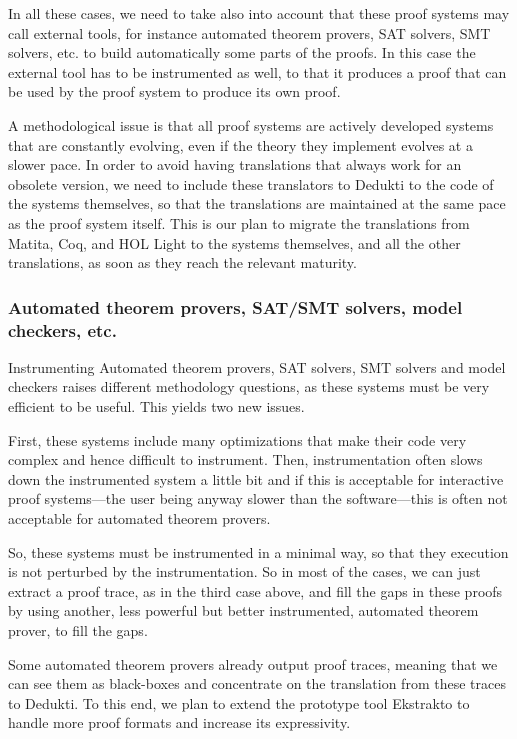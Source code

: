 In all these cases, we need to take also into account that these proof
systems may call external tools, for instance automated theorem
provers, SAT solvers, SMT solvers, etc. to build automatically some
parts of the proofs. In this case the external tool has to be
instrumented as well, to that it produces a proof that can be used by
the proof system to produce its own proof.

A methodological issue is that all proof systems are actively
developed systems that are constantly evolving, even if the theory
they implement evolves at a slower pace. In order to avoid having
translations that always work for an obsolete version, we need to
include these translators to Dedukti to the code of the systems
themselves, so that the translations are maintained at the same pace
as the proof system itself. This is our plan to migrate the
translations from Matita, Coq, and HOL Light to the systems
themselves, and all the other translations, as soon as they reach the
relevant maturity.

\subsubsection*{Automated theorem provers, SAT/SMT solvers, model checkers,
  etc.}

Instrumenting Automated theorem provers, SAT solvers, SMT solvers and
model checkers raises different methodology questions, as these systems
must be very efficient to be useful. This yields two new issues.

First, these systems include many optimizations that make their code
very complex and hence difficult to instrument. Then, instrumentation
often slows down the instrumented system a little bit and if this is
acceptable for interactive proof systems---the user being anyway
slower than the software---this is often not acceptable for automated
theorem provers.

So, these systems must be instrumented in a minimal way, so that they
execution is not perturbed by the instrumentation. So in most of the
cases, we can just extract a proof trace, as in the third case above,
and fill the gaps in these proofs by using another, less powerful but better
instrumented, automated theorem prover, to fill the gaps. 

Some automated theorem provers already output proof traces, meaning
that we can see them as black-boxes and concentrate on the translation
from these traces to Dedukti. To this end, we plan to extend the
prototype tool Ekstrakto to handle more proof formats and increase its
expressivity.

